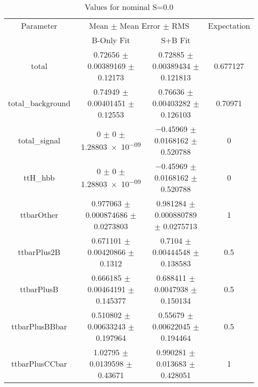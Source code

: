 \begin{table}
\centering
\caption{Values for nominal S=0.0}
\begin{tabular}{cccc}
\toprule
Parameter & \multicolumn{2}{c}{Mean $\pm$ Mean Error $\pm$ RMS} & Expectation\\
 & B-Only Fit & S+B Fit & \\
\midrule
total & \num{0.72656} $\pm$ \num{0.00389169} $\pm$ \num{0.12173} & \num{0.72885} $\pm$ \num{0.00389434} $\pm$ \num{0.121813} & \num{0.677127}\\
total\_background & \num{0.74949} $\pm$ \num{0.00401451} $\pm$ \num{0.12553} & \num{0.76636} $\pm$ \num{0.00403282} $\pm$ \num{0.126103} & \num{0.70971}\\
total\_signal & \num{0} $\pm$ \num{0} $\pm$ \num{1.28803e-09} & \num{-0.45969} $\pm$ \num{0.0168162} $\pm$ \num{0.520788} & \num{0}\\
ttH\_hbb & \num{0} $\pm$ \num{0} $\pm$ \num{1.28803e-09} & \num{-0.45969} $\pm$ \num{0.0168162} $\pm$ \num{0.520788} & \num{0}\\
ttbarOther & \num{0.977063} $\pm$ \num{0.000874686} $\pm$ \num{0.0273803} & \num{0.981284} $\pm$ \num{0.000880789} $\pm$ \num{0.0275713} & \num{1}\\
ttbarPlus2B & \num{0.671101} $\pm$ \num{0.00420866} $\pm$ \num{0.1312} & \num{0.7104} $\pm$ \num{0.00444548} $\pm$ \num{0.138583} & \num{0.5}\\
ttbarPlusB & \num{0.666185} $\pm$ \num{0.00464191} $\pm$ \num{0.145377} & \num{0.688411} $\pm$ \num{0.0047938} $\pm$ \num{0.150134} & \num{0.5}\\
ttbarPlusBBbar & \num{0.510802} $\pm$ \num{0.00633243} $\pm$ \num{0.197964} & \num{0.55679} $\pm$ \num{0.00622045} $\pm$ \num{0.194464} & \num{0.5}\\
ttbarPlusCCbar & \num{1.02795} $\pm$ \num{0.0139598} $\pm$ \num{0.43671} & \num{0.990281} $\pm$ \num{0.013683} $\pm$ \num{0.428051} & \num{1}\\
\bottomrule
\end{tabular}
\end{table}